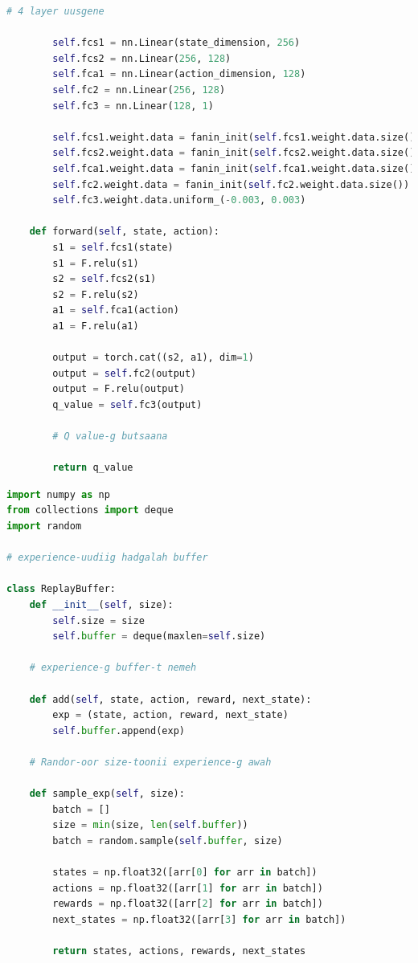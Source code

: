 \documentclass[12pt,A4]{report}
\begin{document}
\begin{lstlisting}[language=Python, caption=models.py, frame=single]
        # 4 layer uusgene

        self.fcs1 = nn.Linear(state_dimension, 256)
        self.fcs2 = nn.Linear(256, 128)
        self.fca1 = nn.Linear(action_dimension, 128)
        self.fc2 = nn.Linear(256, 128)
        self.fc3 = nn.Linear(128, 1)

        self.fcs1.weight.data = fanin_init(self.fcs1.weight.data.size())
        self.fcs2.weight.data = fanin_init(self.fcs2.weight.data.size())
        self.fca1.weight.data = fanin_init(self.fca1.weight.data.size())
        self.fc2.weight.data = fanin_init(self.fc2.weight.data.size())
        self.fc3.weight.data.uniform_(-0.003, 0.003)

    def forward(self, state, action):
        s1 = self.fcs1(state)
        s1 = F.relu(s1)
        s2 = self.fcs2(s1)
        s2 = F.relu(s2)
        a1 = self.fca1(action)
        a1 = F.relu(a1)

        output = torch.cat((s2, a1), dim=1)
        output = self.fc2(output)
        output = F.relu(output)
        q_value = self.fc3(output)

        # Q value-g butsaana

        return q_value
\end{lstlisting}

\begin{lstlisting}[language=Python, caption=memory.py, frame=single]
import numpy as np
from collections import deque
import random

# experience-uudiig hadgalah buffer

class ReplayBuffer:
    def __init__(self, size):
        self.size = size
        self.buffer = deque(maxlen=self.size)

    # experience-g buffer-t nemeh

    def add(self, state, action, reward, next_state):
        exp = (state, action, reward, next_state)
        self.buffer.append(exp)

    # Randor-oor size-toonii experience-g awah

    def sample_exp(self, size):
        batch = []
        size = min(size, len(self.buffer))
        batch = random.sample(self.buffer, size)
        
        states = np.float32([arr[0] for arr in batch])
        actions = np.float32([arr[1] for arr in batch])
        rewards = np.float32([arr[2] for arr in batch])
        next_states = np.float32([arr[3] for arr in batch])
        
        return states, actions, rewards, next_states
\end{lstlisting}
\end{document}
